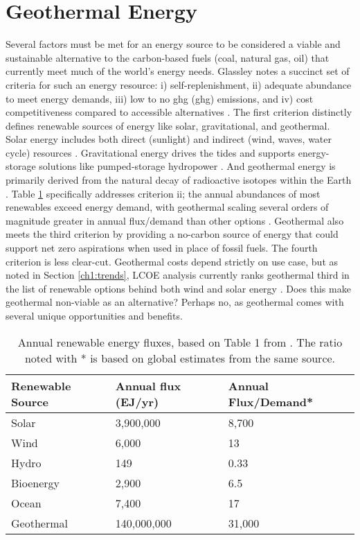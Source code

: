 \section{Geothermal Energy}\label{ch1:geothermal}
Several factors must be met for an energy source to be considered a viable and sustainable alternative to the carbon-based fuels (coal, natural gas, oil) that currently meet much of the world’s energy needs. Glassley notes a succinct set of criteria for such an energy resource: i) self-replenishment, ii) adequate abundance to meet energy demands, iii) low to no \acrlong{ghg} (\acrshort{ghg}) emissions, and iv) cost competitiveness compared to accessible alternatives \citep{glassley_geothermal_2015}. The first criterion distinctly defines renewable sources of energy like solar, gravitational, and geothermal. Solar energy includes both direct (sunlight) and indirect (wind, waves, water cycle) resources \citep{hohmeyer_ipcc_2008}. Gravitational energy drives the tides and supports energy-storage solutions like pumped-storage hydropower \citep{eere_pumped-storage_2021,hohmeyer_ipcc_2008}. And geothermal energy is primarily derived from the natural decay of radioactive isotopes within the Earth \citep{hohmeyer_ipcc_2008}. Table \ref{tab:renewableflux} specifically addresses criterion ii; the annual abundances of most renewables exceed energy demand, with geothermal scaling several orders of magnitude greater in annual flux/demand than other options \citep{hohmeyer_ipcc_2008}. Geothermal also meets the third criterion by providing a no-carbon source of energy that could support net zero aspirations when used in place of fossil fuels. The fourth criterion is less clear-cut. Geothermal costs depend strictly on use case, but as noted in Section \ref{ch1:trends}, LCOE analysis currently ranks geothermal third in the list of renewable options behind both wind and solar energy \citep{lazard_lazards_2020}. Does this make geothermal non-viable as an alternative? Perhaps no, as geothermal comes with several unique opportunities and benefits.

\begin{table}[h!]
\centering
\begin{tabular}{|l|l|l|}
\hline
\textbf{Renewable Source} & \textbf{Annual flux (EJ/yr)} & \textbf{Annual Flux/Demand*} \\ \hline
Solar      & 3,900,000   & 8,700  \\ \hline
Wind       & 6,000       & 13     \\ \hline
Hydro      & 149         & 0.33   \\ \hline
Bioenergy  & 2,900       & 6.5    \\ \hline
Ocean      & 7,400       & 17     \\ \hline
Geothermal & 140,000,000 & 31,000 \\ \hline
\end{tabular}
\caption{Annual renewable energy fluxes, based on Table 1 from \protect\citep{hohmeyer_ipcc_2008}. The ratio noted with * is based on global estimates from the same source.}
\label{tab:renewableflux}
\end{table}

